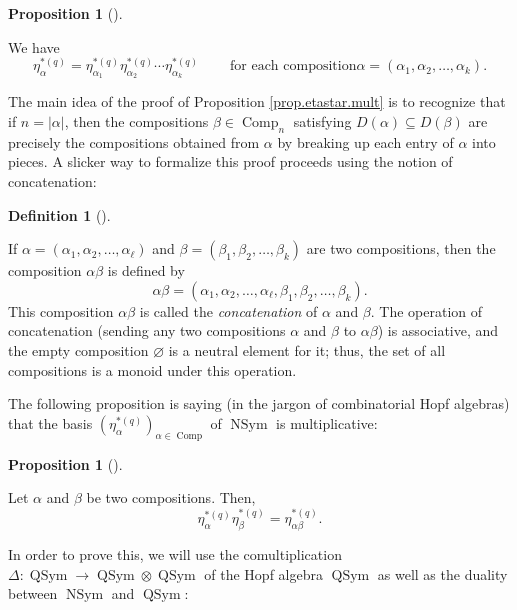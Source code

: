 \documentclass[numbers=enddot,12pt,final,onecolumn,notitlepage]{scrartcl}%
\theoremstyle{definition}
\newtheorem{prop}[theo]{Proposition}
\newenvironment{proposition}[1][]
{\begin{prop}[#1]\begin{leftbar}}
{\end{leftbar}\end{prop}}
\newtheorem{defi}[theo]{Definition}
\newenvironment{definition}[1][]
{\begin{defi}[#1]\begin{leftbar}}
{\end{leftbar}\end{defi}}
\begin{document}
\begin{proposition}
\label{prop.etastar.mult}We have%
\[
\eta_{\alpha}^{\ast\left(  q\right)  }=\eta_{\alpha_{1}}^{\ast\left(
q\right)  }\eta_{\alpha_{2}}^{\ast\left(  q\right)  }\cdots\eta_{\alpha_{k}%
}^{\ast\left(  q\right)  }\ \ \ \ \ \ \ \ \ \ \text{for each composition
}\alpha=\left(  \alpha_{1},\alpha_{2},\ldots,\alpha_{k}\right)  .
\]

\end{proposition}

The main idea of the proof of Proposition \ref{prop.etastar.mult} is to
recognize that if $n=\left\vert \alpha\right\vert $, then the compositions
$\beta\in\operatorname*{Comp}\nolimits_{n}$ satisfying $D\left(
\alpha\right)  \subseteq D\left(  \beta\right)  $ are precisely the
compositions obtained from $\alpha$ by breaking up each entry of $\alpha$ into
pieces. A slicker way to formalize this proof proceeds using the notion of concatenation:

\begin{definition}
If $\alpha=\left(  \alpha_{1},\alpha_{2},\ldots,\alpha_{\ell}\right)  $ and
$\beta=\left(  \beta_{1},\beta_{2},\ldots,\beta_{k}\right)  $ are two
compositions, then the composition $\alpha\beta$ is defined by%
\[
\alpha\beta=\left(  \alpha_{1},\alpha_{2},\ldots,\alpha_{\ell},\beta_{1}%
,\beta_{2},\ldots,\beta_{k}\right)  .
\]
This composition $\alpha\beta$ is called the \emph{concatenation} of $\alpha$
and $\beta$. The operation of concatenation (sending any two compositions
$\alpha$ and $\beta$ to $\alpha\beta$) is associative, and the empty
composition $\varnothing$ is a neutral element for it; thus, the set of all
compositions is a monoid under this operation.
\end{definition}

The following proposition is saying (in the jargon of combinatorial Hopf
algebras) that the basis $\left(  \eta_{\alpha}^{\ast\left(  q\right)
}\right)  _{\alpha\in\operatorname*{Comp}}$ of $\operatorname*{NSym}$ is multiplicative:

\begin{proposition}
\label{prop.etastar.concat2}Let $\alpha$ and $\beta$ be two compositions.
Then,%
\[
\eta_{\alpha}^{\ast\left(  q\right)  }\eta_{\beta}^{\ast\left(  q\right)
}=\eta_{\alpha\beta}^{\ast\left(  q\right)  }.
\]

\end{proposition}

In order to prove this, we will use the comultiplication $\Delta
:\operatorname*{QSym}\rightarrow\operatorname*{QSym}\otimes
\operatorname*{QSym}$ of the Hopf algebra $\operatorname*{QSym}$ as well as
the duality between $\operatorname*{NSym}$ and $\operatorname*{QSym}$:
\end{document}
